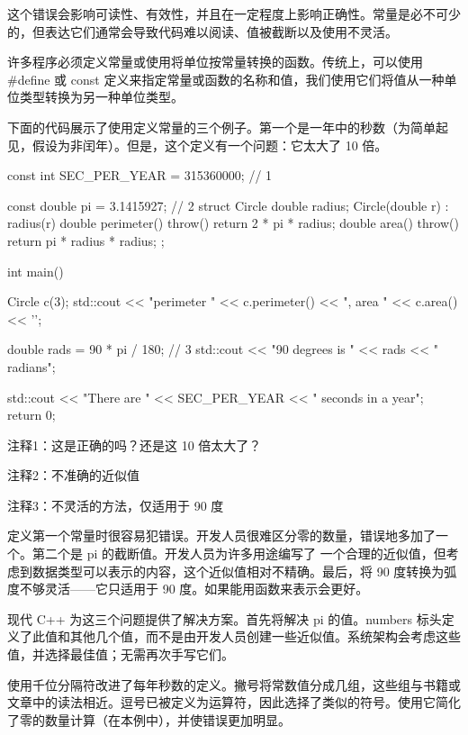 这个错误会影响可读性、有效性，并且在一定程度上影响正确性。常量是必不可少的，但表达它们通常会导致代码难以阅读、值被截断以及使用不灵活。


许多程序必须定义常量或使用将单位按常量转换的函数。传统上，可以使用 \#define 或 const 定义来指定常量或函数的名称和值，我们使用它们将值从一种单位类型转换为另一种单位类型。

下面的代码展示了使用定义常量的三个例子。第一个是一年中的秒数（为简单起见，假设为非闰年）。但是，这个定义有一个问题：它太大了 10 倍。


\begin{cpp}
const int SEC_PER_YEAR = 315360000; // 1

const double pi = 3.1415927; // 2
struct Circle {
  double radius;
  Circle(double r) : radius(r) {}
  double perimeter() throw() { return 2 * pi * radius; }
  double area() throw() { return pi * radius * radius; }
};

int main() {
  Circle c(3);
  std::cout << "perimeter " << c.perimeter() << ", area " << c.area() << '\n';

  double rads = 90 * pi / 180; // 3
  std::cout << "90 degrees is " << rads << " radians\n";

  std::cout << "There are " << SEC_PER_YEAR << " seconds in a year\n";
  return 0;
}
\end{cpp}

{\footnotesize
注释1：这是正确的吗？还是这 10 倍太大了？

注释2：不准确的近似值

注释3：不灵活的方法，仅适用于 90 度
}


定义第一个常量时很容易犯错误。开发人员很难区分零的数量，错误地多加了一个。第二个是 pi 的截断值。开发人员为许多用途编写了 一个合理的近似值，但考虑到数据类型可以表示的内容，这个近似值相对不精确。最后，将 90 度转换为弧度不够灵活——它只适用于 90 度。如果能用函数来表示会更好。


现代 C++ 为这三个问题提供了解决方案。首先将解决 pi 的值。numbers 标头定义了此值和其他几个值，而不是由开发人员创建一些近似值。系统架构会考虑这些值，并选择最佳值；无需再次手写它们。

使用千位分隔符改进了每年秒数的定义。撇号将常数值分成几组，这些组与书籍或文章中的读法相近。逗号已被定义为运算符，因此选择了类似的符号。使用它简化了零的数量计算（在本例中），并使错误更加明显。

